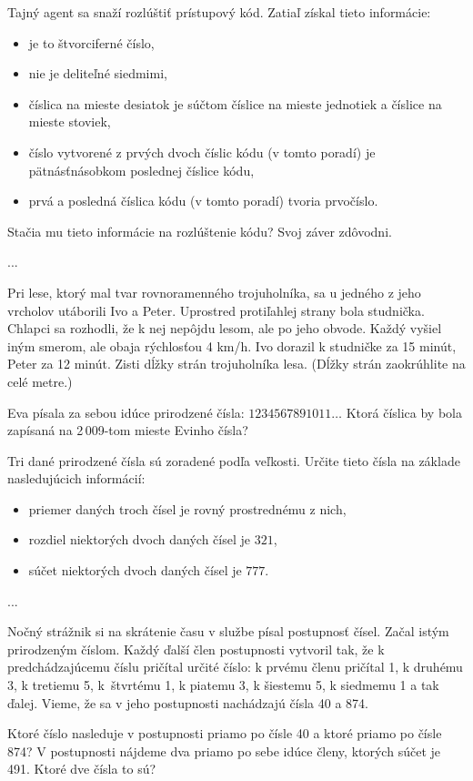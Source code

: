 {%
Tajný agent sa snaží rozlúštiť prístupový kód. Zatiaľ získal tieto informácie:
\begin{itemize}
\item je to štvorciferné číslo,
\item nie je deliteľné siedmimi,
\item číslica na mieste desiatok je súčtom číslice na mieste jednotiek a číslice na mieste
stoviek,
\item číslo vytvorené z prvých dvoch číslic kódu (v tomto poradí) je pätnásťnásobkom
poslednej číslice kódu,
\item prvá a posledná číslica kódu (v tomto poradí) tvoria prvočíslo.
\end{itemize}
\noindent
Stačia mu tieto informácie na rozlúštenie kódu? Svoj záver zdôvodni.}

{%
...}

{%
Pri lese, ktorý mal tvar rovnoramenného trojuholníka, sa u jedného z jeho vrcholov
utáborili Ivo a Peter. Uprostred protiľahlej strany bola studnička. Chlapci sa rozhodli,
že k nej nepôjdu lesom, ale po jeho obvode. Každý vyšiel iným smerom, ale obaja
rýchlosťou 4 km/h. Ivo dorazil k studničke za 15 minút, Peter za 12 minút. Zisti dĺžky
strán trojuholníka lesa. (Dĺžky strán zaokrúhlite na celé metre.)}

{%
Eva písala za sebou idúce prirodzené čísla: $1234567891011\dots$ Ktorá číslica by bola
zapísaná na 2\,009-tom mieste Evinho čísla?}

{%
Tri dané prirodzené čísla sú zoradené podľa veľkosti. Určite tieto čísla na základe
nasledujúcich informácií:
\begin{itemize}
\item priemer daných troch čísel je rovný prostrednému z nich,
\item rozdiel niektorých dvoch daných čísel je $321$,
\item súčet niektorých dvoch daných čísel je $777$.
\end{itemize}
}

{%
...}

{%
Nočný strážnik si na skrátenie času v službe písal postupnosť čísel. Začal istým
prirodzeným číslom. Každý ďalší člen postupnosti vytvoril tak, že
k predchádzajúcemu číslu pričítal určité číslo: k prvému členu pričítal 1, k druhému 3,
k tretiemu 5, k~štvrtému 1, k piatemu 3, k šiestemu 5, k siedmemu 1 a tak ďalej.
Vieme, že sa v jeho postupnosti nachádzajú čísla 40 a 874.
\begin{itemize}
 Ktoré číslo nasleduje v postupnosti priamo po čísle 40 a ktoré priamo po čísle
874?
 V postupnosti nájdeme dva priamo po sebe idúce členy, ktorých súčet je 491.
Ktoré dve čísla to sú?
\end{itemize}
}

